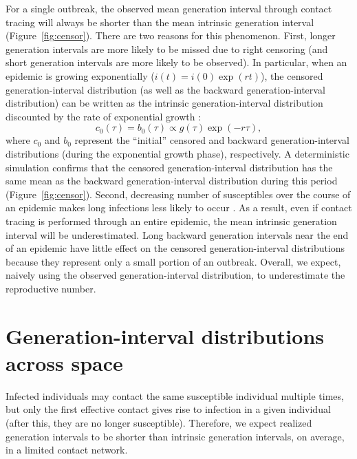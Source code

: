 \documentclass[12pt]{article}
\begin{document}
For a single outbreak, the observed mean  generation interval through contact tracing will always be shorter than the mean intrinsic generation interval (Figure~\ref{fig:censor}).
There are two reasons for this phenomenon.
First, longer generation intervals are more likely to be missed due to right censoring (and short generation intervals are more likely to be observed).
In particular, when an epidemic is growing exponentially ($i(t) = i(0) \exp(rt)$), 
the censored generation-interval distribution (as well as the backward generation-interval distribution) can be written as the intrinsic generation-interval distribution discounted by the rate of exponential growth \citep{britton2019estimation}:
\begin{equation}
c_0(\tau) = b_0(\tau) \propto g(\tau) \exp(-r\tau),
\label{eq:exp}
\end{equation}
where $c_0$ and $b_0$ represent the ``initial'' censored and backward generation-interval distributions (during the exponential growth phase), respectively.
A deterministic simulation confirms that the censored generation-interval distribution has the same mean as the backward generation-interval distribution during this period (Figure~\ref{fig:censor}).
Second, decreasing number of susceptibles over the course of an epidemic makes long infections less likely to occur \citep{champredon2015intrinsic}.
As a result, even if contact tracing is performed through an entire epidemic, the mean intrinsic generation interval will be underestimated.
Long backward generation intervals near the end of an epidemic have little effect on the censored generation-interval distributions because they represent only a small portion of an outbreak.
Overall, we expect, naively using the observed generation-interval distribution, to underestimate the reproductive number.


\section{Generation-interval distributions across space}

Infected individuals may contact the same susceptible individual multiple times, but only the first effective contact gives rise to infection in a given individual (after this, they are no longer susceptible).
Therefore, we expect realized generation intervals to be shorter than intrinsic generation intervals, on average, in a limited contact network.
\end{document}
